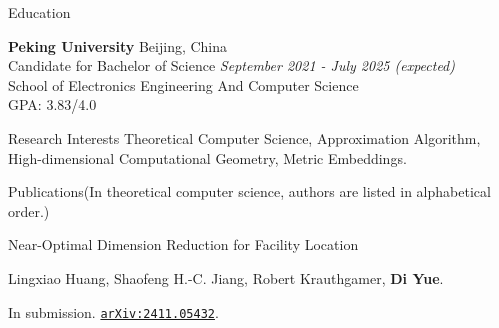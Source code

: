 \documentclass{resume} %
\begin{document}

\begin{rSection}{Education}

{\bf Peking University} \hfill {Beijing, China} 
\\ Candidate for Bachelor of Science \hfill {\em September 2021 - July 2025 (expected)}
\\ School of Electronics Engineering And Computer Science
\\ GPA: 3.83/4.0



\end{rSection}

\begin{rSection}{Research Interests}{}
Theoretical Computer Science, Approximation Algorithm, High-dimensional Computational Geometry, Metric Embeddings.
\end{rSection}

\begin{rSection}{Publications}{(In theoretical computer science, authors are listed in alphabetical order.)}

    \begin{pubSubsection}{Near-Optimal Dimension Reduction for Facility Location}
        \item Lingxiao Huang, Shaofeng H.-C. Jiang, Robert Krauthgamer, \textbf{Di Yue}.
        \item In submission. 
        \href{https://arxiv.org/abs/2411.05432}{\texttt{arXiv:2411.05432}}.
    \end{pubSubsection}
\end{rSection}
\end{document}
